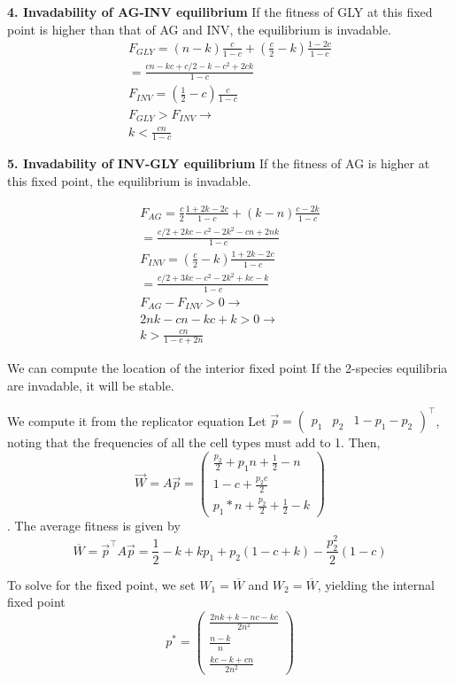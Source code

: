 \documentclass[12pt]{report}
\begin{document}
\textbf{4. Invadability of AG-INV equilibrium}
If the fitness of GLY at this fixed point is higher than that of AG and INV, the equilibrium is invadable. 
\begin{gather*}
F_{GLY} = (n - k) \frac{c}{1-c} + (\frac{c}{2} - k) \frac{1 - 2c}{1 -c} \\
 = \frac{cn - kc + c / 2 - k - c^2 + 2ck}{1 -c} \\
F_{INV} = (\frac{1}{2} - c) \frac{c}{1 -c} \\
F_{GLY} > F_{INV} \rightarrow \\
k < \frac{cn}{1-c}
\end{gather*}

\textbf{5. Invadability of INV-GLY equilibrium}
If the fitness of AG is higher at this fixed point, the equilibrium is invadable. 

\begin{gather*}
F_{AG} = \frac{c}{2} \frac{1 + 2 k  - 2 c}{1 - c} + (k - n) \frac{c - 2k}{1-c} \\
 = \frac{c / 2 + 2 k c - c^2 - 2 k ^2 - c n + 2n k}{1 - c} \\
F_{INV} = (\frac{c}{2} - k) \frac{1 + 2 k - 2 c}{1 -c}  \\
= \frac{c / 2 + 3 k c - c ^ 2 - 2 k ^2 + k c - k}{1 - c}  \\
F_{AG} - F_{INV} > 0 \rightarrow \\
2 n k - c n - k c + k > 0 \rightarrow \\ 
k > \frac{cn}{1 - c + 2n}
\end{gather*}


We can compute the location of the interior fixed point If the 2-species equilibria are invadable, it will be stable. 

We compute it from the replicator equation
Let $\vec{p} = { \begin{pmatrix} p_1 & p_2 & 1-p_1-p_2 \end{pmatrix}}^\top$, noting that the frequencies of all the cell types must add to 1. Then, $$\vec{W} = A\vec{p} = 
{\begin{pmatrix} \frac{p_2}{2} + p_1 n + \frac{1}{2}-n\\
1-c + \frac{p_2 c}{2}\\ %
p_1*n+\frac{p_2}{2} + \frac{1}{2}-k \end{pmatrix}}$$. The average fitness is given by  $$\overline{W} = \vec{p}^\top A \vec{p} = \frac{1}{2}-k+ k p_1 + p_2 (1 - c + k) - \frac{p_2^2}{2} (1-c) $$

To solve for the fixed point, we set $W_1 = \overline{W}$ and $W_2 = \overline{W}$, yielding the internal fixed point 
$$p^* = {\begin{pmatrix}\displaystyle{\frac{2 n k + k - n c - k c}{2n^2}}\\
		\displaystyle{\frac{n-k}{n}}\\
		\displaystyle{\frac{k c - k + c n}{2n^2}}
		\end{pmatrix}}$$
		
\end{document}

